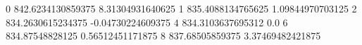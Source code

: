 0 842.6234130859375 8.31304931640625
1 835.4088134765625 1.09844970703125
2 834.2630615234375 -0.04730224609375
4 834.3103637695312 0.0
6 834.87548828125 0.56512451171875
8 837.68505859375 3.37469482421875
